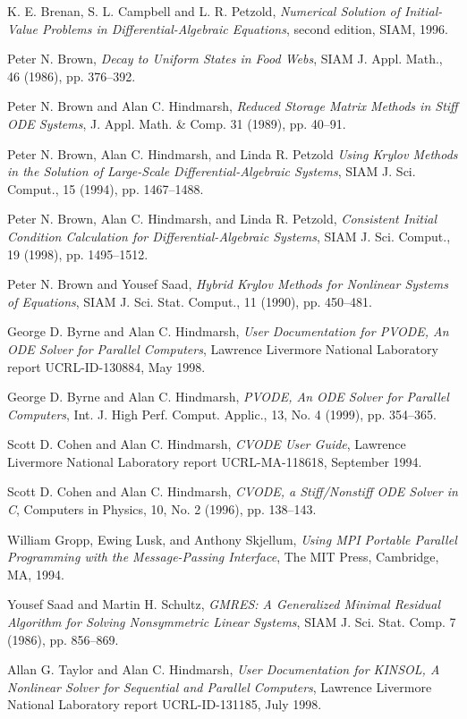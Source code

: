 \documentclass[11pt]{article}
\begin{document}
\begin{thebibliography}{9}

K. E. Brenan, S. L. Campbell and L. R. Petzold, {\em Numerical Solution
of Initial-Value Problems in Differential-Algebraic Equations}, second
edition, SIAM, 1996.

Peter N. Brown, {\em Decay to Uniform States in Food Webs},
SIAM J. Appl.  Math., 46 (1986), pp. 376--392.

Peter N. Brown and Alan C. Hindmarsh, {\it Reduced Storage Matrix Methods
in Stiff ODE Systems}, J. Appl. Math. \& Comp. 31 (1989), pp. 40--91.

Peter N. Brown,  Alan C. Hindmarsh, and Linda R. Petzold {\em Using Krylov
Methods in the Solution of Large-Scale Differential-Algebraic Systems}, 
SIAM J. Sci. Comput., 15 (1994), pp. 1467--1488.

Peter N. Brown, Alan C. Hindmarsh, and Linda R. Petzold, {\em Consistent
Initial Condition Calculation for Differential-Algebraic Systems}, 
SIAM J. Sci. Comput., 19 (1998), pp. 1495--1512.

Peter N. Brown and Yousef Saad, {\it Hybrid Krylov Methods for 
Nonlinear Systems of Equations}, SIAM J. Sci. Stat. Comput., 11 (1990), 
pp. 450--481.

George D. Byrne and Alan C. Hindmarsh, {\it User Documentation for PVODE, 
An ODE Solver for Parallel Computers}, Lawrence Livermore National 
Laboratory report UCRL-ID-130884, May 1998.

George D. Byrne and Alan C. Hindmarsh,
{\it PVODE, An ODE Solver for Parallel Computers}, 
Int. J. High Perf. Comput. Applic., 13, No. 4 (1999), pp. 354--365.

Scott D. Cohen and Alan C. Hindmarsh, {\it CVODE User Guide},
Lawrence Livermore National Laboratory report UCRL-MA-118618,
September 1994.

Scott D. Cohen and Alan C. Hindmarsh, {\it CVODE, a Stiff/Nonstiff ODE
Solver in C}, Computers in Physics, 10, No. 2 (1996), pp. 138--143.

William Gropp, Ewing Lusk, and Anthony Skjellum, {\it Using MPI
Portable Parallel Programming with the Message-Passing Interface},
The MIT Press, Cambridge, MA, 1994.

Yousef Saad and Martin H. Schultz, {\em GMRES: A Generalized Minimal Residual
Algorithm for Solving Nonsymmetric Linear Systems}, SIAM J. Sci. Stat.
Comp. 7 (1986), pp. 856--869.

Allan G. Taylor and Alan C. Hindmarsh, {\em User Documentation for
KINSOL, A Nonlinear Solver for Sequential and Parallel Computers},
Lawrence Livermore National Laboratory report UCRL-ID-131185, July 1998.

\end{thebibliography}
\end{document}
